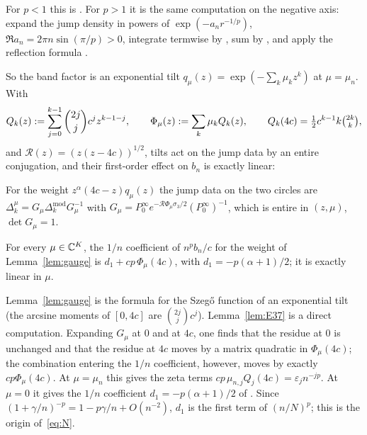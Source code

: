 For $p<1$ this is \cite[Lemma~10.1(iii)--(iv)]{PaperII}. For $p>1$ it is the same computation on the negative axis: expand the jump
density in powers of $\exp(-a_nr^{-1/p})$, $\Re a_n=2\pi n\sin(\pi/p)>0$, integrate termwise by \cite[(5.9.1)]{DLMF}, sum by
\cite[(25.2.1)]{DLMF}, and apply the reflection formula \cite[(25.4.1)]{DLMF}.

So the band factor is an exponential tilt $q_\mu(z)=\exp(-\sum_k\mu_kz^k)$ at $\mu=\mu_n$. With
\begin{equation}\label{eq:Qk}
  Q_k(z):=\sum_{j=0}^{k-1}\binom{2j}{j}c^jz^{k-1-j},\qquad \Phi_\mu(z):=\sum_k\mu_kQ_k(z),\qquad Q_k(4c)=\tfrac12c^{k-1}k\tbinom{2k}{k},
\end{equation}
and $\mathcal R(z)=(z(z-4c))^{1/2}$, tilts act on the jump data by an entire conjugation, and their first-order effect on $b_n$ is exactly linear:

\begin{lemma}[gauge]\label{lem:gauge}
For the weight $z^\alpha(4c-z)q_\mu(z)$ the jump data on the two circles are $\Delta_k^\mu=G_\mu\Delta_k^{\mathrm{mod}}G_\mu^{-1}$ with
$G_\mu=P_0^\infty e^{-\mathcal R\Phi_\mu\sigma_3/2}(P_0^\infty)^{-1}$, which is entire in $(z,\mu)$, $\det G_\mu=1$.
\end{lemma}

\begin{lemma}\label{lem:E37}
For every $\mu\in\mathbb{C}^K$, the $1/n$ coefficient of $n^pb_n/c$ for the weight of Lemma~\ref{lem:gauge} is $d_1+cp\,\Phi_\mu(4c)$, with
$d_1=-p(\alpha+1)/2$; it is exactly linear in $\mu$.
\end{lemma}

Lemma~\ref{lem:gauge} is the formula for the Szeg\H{o} function of an exponential tilt (the arcsine moments of $[0,4c]$ are
$\binom{2j}jc^j$). Lemma~\ref{lem:E37} is a direct computation. Expanding $G_\mu$ at $0$ and at $4c$, one finds that the residue at $0$ is unchanged and that
the residue at $4c$ moves by a matrix quadratic in $\Phi_\mu(4c)$; the combination entering the $1/n$ coefficient, however, moves by exactly
$cp\Phi_\mu(4c)$. At $\mu=\mu_n$ this gives the zeta terms $cp\,\mu_{n,j}Q_j(4c)=\varepsilon_jn^{-jp}$. At $\mu=0$ it gives the $1/n$
coefficient $d_1=-p(\alpha+1)/2$ of \cite[Theorem~1.4]{PaperII}. Since $(1+\gamma/n)^{-p}=1-p\gamma/n+O(n^{-2})$, $d_1$ is the first term of
$(n/N)^p$; this is the origin of~\eqref{eq:N}.
